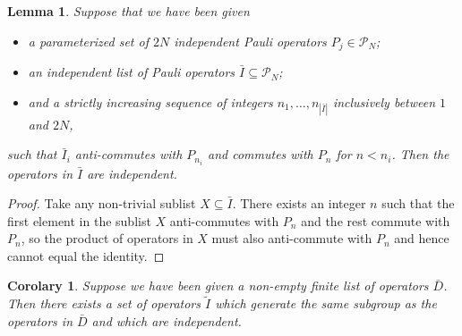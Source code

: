 \documentclass[twocolumn,showpacs,preprintnumbers,amsmath,amssymb,nofootinbib,pra,floatfix]{revtex4}
\newtheorem{lemma}{Lemma}
\newtheorem{corolary}{Corolary}
\begin{document}
\begin{lemma}
\label{result-is-independent}
Suppose that we have been given
\begin{itemize}
\item a parameterized set of $2N$ independent Pauli operators $P_j\in\mathscr{P}_N$;
\item an \emph{independent} list of Pauli operators $\bar I\subseteq \mathscr{P}_N$;
\item and a strictly increasing sequence of integers $n_1,\dots, n_{|\bar I|}$ inclusively between $1$ and $2N$,
\end{itemize}
such that $\bar I_i$ anti-commutes with $P_{n_i}$ and commutes with $P_n$ for $n< n_i$.  Then the operators in $\bar I$ are independent.
\end{lemma}

\begin{proof}
Take any non-trivial sublist $X\subseteq \bar I$.  There exists an integer $n$ such that the first element in the sublist $X$ anti-commutes with $P_n$ and the rest commute with $P_n$, so the product of operators in $X$ must also anti-commute with $P_n$ and hence cannot equal the identity.
\end{proof}

\begin{corolary}
\label{corolary-make-independent}
Suppose we have been given a non-empty finite list of operators $\bar D$.  Then there exists a set of operators $\tilde I$ which generate the same subgroup as the operators in $\bar D$ and which are independent.
\end{corolary}
\end{document}
